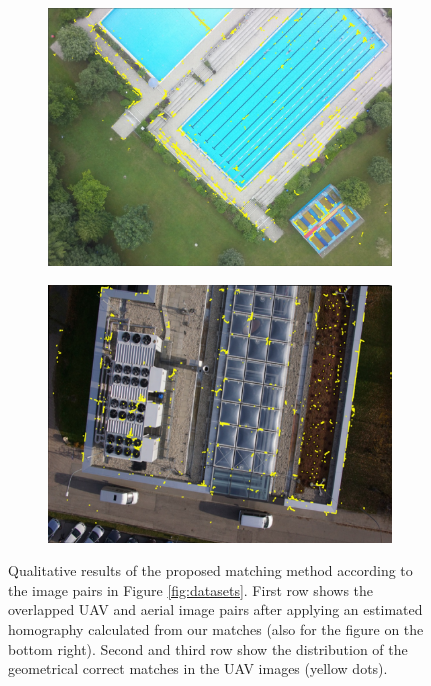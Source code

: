 \begin{figure}[tbp]
\begin{subfigure}[b]{0.243\textwidth}
           \includegraphics[width=\textwidth]{figures_matches/pool2_Fmatch.jpg}
       \end{subfigure}
       \hfill
       \begin{subfigure}[b]{0.243\textwidth}  
           \centering 
           \includegraphics[width=\textwidth]{figures_matches/eoc_Fmatch.jpg}
       \end{subfigure}
   
       \caption{Qualitative results of the proposed matching method according to the image pairs in Figure \ref{fig:datasets}. First row shows the overlapped UAV and aerial image pairs after applying an estimated homography calculated from our matches (also for the figure on the bottom right). Second and third row show the distribution of the geometrical correct matches in the UAV images (yellow dots).}
       \label{fig:results}
\end{figure}



